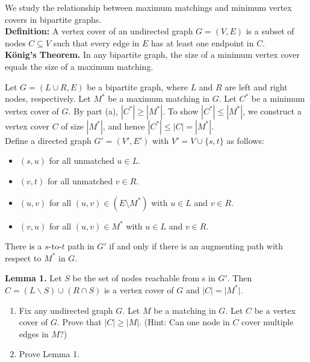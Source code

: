 \documentclass{cs0500}
\begin{document}
\maketitle


\begin{problem}
    We study the relationship between maximum matchings and minimum vertex covers in bipartite graphs.
    \\ \textbf{Definition: } A vertex cover of an undirected graph $G = (V, E)$ is a subset of nodes $C \subseteq V$ such that every edge in $E$ has at least one endpoint in $C$. 
    \\ \textbf{König’s Theorem.} In any bipartite graph, the size of a minimum vertex cover equals the size of a maximum matching.

    \medskip 
    Let $G = (L \cup R, E)$ be a bipartite graph, where $L$ and $R$ are left and right nodes, respectively. Let $M^*$ be a maximum matching in $G$. Let $C^*$ be a minimum vertex cover of $G$. By part (a), $|C^*| \ge |M^*|$. To show $|C^*| \le |M^*|$, we construct a vertex cover $C$ of size $|M^*|$, and hence $|C^*| \le |C| = |M^*|$.
    \medskip 
    \\ Define a directed graph $G'=(V',E')$ with $V'=V\cup\{s,t\}$ as follows:
    \begin{itemize}
    \item $(s, u)$ for all unmatched $u \in L$.
    \item $(v, t)$ for all unmatched $v \in R$.
    \item $(u, v)$ for all $(u, v) \in (E \setminus M^*)$ with $u \in L$ and $v \in R$.
    \item $(v, u)$ for all $(u, v) \in M^*$ with $u \in L$ and $v \in R$.
    \end{itemize}

    There is a $s$-to-$t$ path in $G'$ if and only if there is an augmenting path with respect to $M^*$ in $G$.

    \textbf{Lemma 1. } Let $S$ be the set of nodes reachable from s in $G'$. Then $C = (L \backslash S) \cup (R \cap S)$ is a vertex cover of $G$ and $\vert C \vert = \vert M^* \vert$.
    \begin{enumerate}
        \item [(a)] Fix any undirected graph $G$. Let $M$ be a matching in $G$. Let $C$ be a vertex cover of $G$. Prove that $\vert C \vert \geq \vert M \vert$. (Hint: Can one node in $C$ cover multiple edges in $M$?)
        \item [(b)] Prove Lemma 1.
    \end{enumerate}
\end{problem}
\begin{solution}
    
\end{solution}
\end{document}
